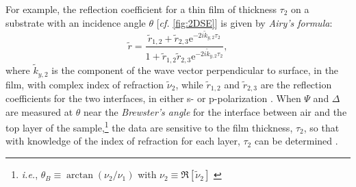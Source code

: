 For example, the reflection coefficient for a thin film of thickness $\tau_2$ on a substrate with an incidence angle $\theta$ [\emph{cf.\@} \cref{fig:2DSE}] is given by \emph{Airy's formula}:
\begin{equation}\label{eq:refl_coeff_example}
 \tilde{r} = \frac{\tilde{r}_{1,2} + \tilde{r}_{2,3} \mathrm{e}^{-2 i \tilde{k}_{y,2} \tau_2}}{1 + \tilde{r}_{1,2} \tilde{r}_{2,3} \mathrm{e}^{-2 i \tilde{k}_{y,2} \tau_2}} ,
 \end{equation} 
where $\tilde{k}_{y,2}$ is the component of the wave vector perpendicular to surface, in the film, with complex index of refraction $\tilde{\nu}_2$, while $\tilde{r}_{1,2}$ and $\tilde{r}_{2,3}$ are the reflection coefficients for the two interfaces, in either s- or p-polarization \cite{Tompkins05,Born80,Gibaud2009}. 
When $\Psi$ and $\Delta$ are measured at $\theta$ near the \emph{Brewster's angle} for the interface between air and the top layer of the sample,\footnote{\emph{i.e.}, $\theta_B \equiv \arctan \left( \nu_2 / \nu_1 \right)$ with $\nu_2 \equiv \Re \left[ \tilde{\nu}_2 \right]$ \cite{Born80}} 
the data are sensitive to the film thickness, $\tau_2$, so that with knowledge of the index of refraction for each layer, $\tau_2$ can be determined \cite{Tompkins05}. 

